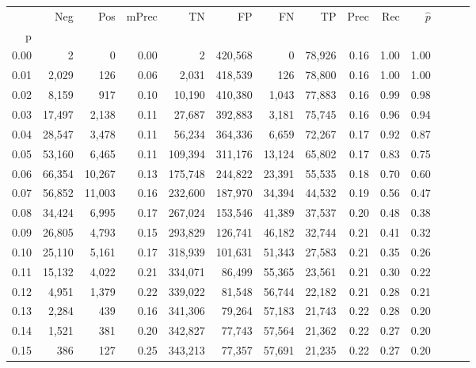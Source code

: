 \begin{tabular}{rrrrrrrrrrrrrr}
\toprule
{} &     Neg &     Pos & mPrec &       TN &       FP &      FN &      TP &  Prec &   Rec & $\hat{p}$ \\
p    &         &         &       &          &          &         &         &       &       &           \\
\midrule
0.00 &       2 &       0 &  0.00 &        2 &  420,568 &       0 &  78,926 &  0.16 &  1.00 &      1.00 \\
0.01 &   2,029 &     126 &  0.06 &    2,031 &  418,539 &     126 &  78,800 &  0.16 &  1.00 &      1.00 \\
0.02 &   8,159 &     917 &  0.10 &   10,190 &  410,380 &   1,043 &  77,883 &  0.16 &  0.99 &      0.98 \\
0.03 &  17,497 &   2,138 &  0.11 &   27,687 &  392,883 &   3,181 &  75,745 &  0.16 &  0.96 &      0.94 \\
0.04 &  28,547 &   3,478 &  0.11 &   56,234 &  364,336 &   6,659 &  72,267 &  0.17 &  0.92 &      0.87 \\
0.05 &  53,160 &   6,465 &  0.11 &  109,394 &  311,176 &  13,124 &  65,802 &  0.17 &  0.83 &      0.75 \\
0.06 &  66,354 &  10,267 &  0.13 &  175,748 &  244,822 &  23,391 &  55,535 &  0.18 &  0.70 &      0.60 \\
0.07 &  56,852 &  11,003 &  0.16 &  232,600 &  187,970 &  34,394 &  44,532 &  0.19 &  0.56 &      0.47 \\
0.08 &  34,424 &   6,995 &  0.17 &  267,024 &  153,546 &  41,389 &  37,537 &  0.20 &  0.48 &      0.38 \\
0.09 &  26,805 &   4,793 &  0.15 &  293,829 &  126,741 &  46,182 &  32,744 &  0.21 &  0.41 &      0.32 \\
0.10 &  25,110 &   5,161 &  0.17 &  318,939 &  101,631 &  51,343 &  27,583 &  0.21 &  0.35 &      0.26 \\
0.11 &  15,132 &   4,022 &  0.21 &  334,071 &   86,499 &  55,365 &  23,561 &  0.21 &  0.30 &      0.22 \\
0.12 &   4,951 &   1,379 &  0.22 &  339,022 &   81,548 &  56,744 &  22,182 &  0.21 &  0.28 &      0.21 \\
0.13 &   2,284 &     439 &  0.16 &  341,306 &   79,264 &  57,183 &  21,743 &  0.22 &  0.28 &      0.20 \\
0.14 &   1,521 &     381 &  0.20 &  342,827 &   77,743 &  57,564 &  21,362 &  0.22 &  0.27 &      0.20 \\
0.15 &     386 &     127 &  0.25 &  343,213 &   77,357 &  57,691 &  21,235 &  0.22 &  0.27 &      0.20 \\

\end{tabular}
